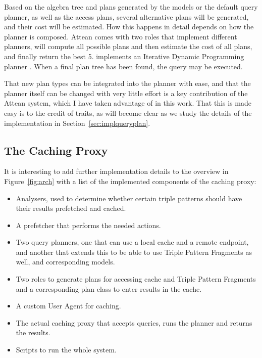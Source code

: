 Based on the algebra tree and plans generated by the models or the
default query planner, as well as the access plans, several
alternative plans will be generated, and their cost will be
estimated. How this happens in detail depends on how the planner is
composed. Attean comes with two roles that implement different
planners,  will compute all
possible plans and then estimate the cost of all plans, and finally
return the best 5.  implements an
Iterative Dynamic Programming planner
\cite{Kossmann:2000:IDP:352958.352982}. When a final plan tree has
been found, the query may be executed.

That new plan types can be integrated into the planner with ease, and
that the planner itself can be changed with very little effort is a
key contribution of the Attean system, which I have taken advantage of
in this work. That this is made easy is to the credit of traits, as
will become clear as we study the details of the implementation in
Section~\ref{sec:implqueryplan}.


\subsection{The Caching Proxy}\label{sec:cacher}

It is interesting to add further implementation details to the
overview in Figure~\ref{fig:arch} with a list of the implemented
components of the caching proxy:

\begin{itemize}
\item Analysers, used to determine whether certain triple patterns
  should have their results prefetched and cached.
\item A prefetcher that performs the needed actions.
\item Two query planners, one that can use a local cache and a remote
  endpoint, and another that extends this to be able to use Triple
  Pattern Fragments as well, and corresponding models.
\item Two roles to generate plans for accessing cache and Triple
  Pattern Fragments and a corresponding plan class to enter results
  in the cache.
\item A custom User Agent for caching.
\item The actual caching proxy that accepts queries, runs the planner
  and returns the results.
\item Scripts to run the whole system.
\end{itemize}

